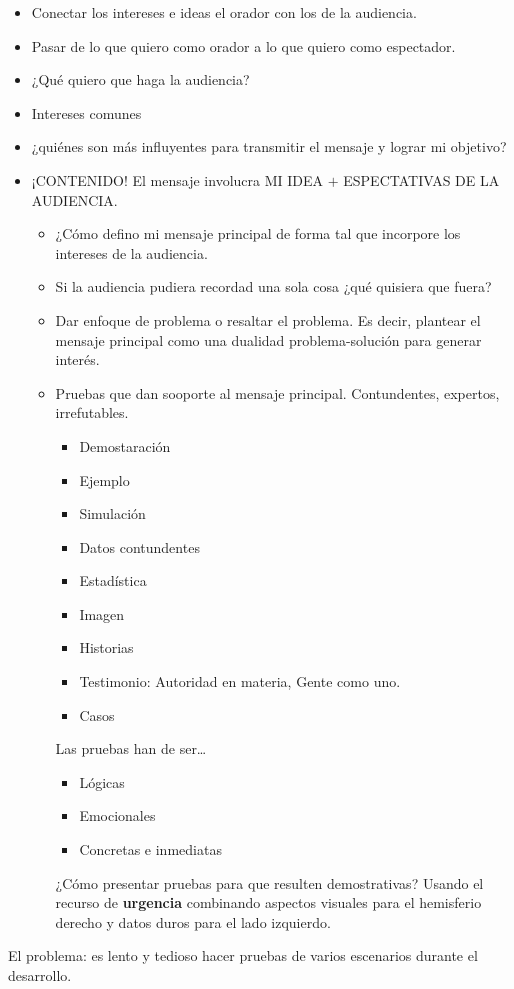 \documentclass[12pt]{article} %
\begin{document}
\begin{itemize}
\item Conectar los intereses e ideas el orador con los de la audiencia. 
\item Pasar de lo que quiero como orador a lo que quiero como espectador.
\item ¿Qué quiero que haga la audiencia?
\item Intereses comunes
\item ¿quiénes son más influyentes para transmitir el mensaje y lograr mi objetivo?
\item ¡CONTENIDO! El mensaje involucra MI IDEA $+$ ESPECTATIVAS DE LA AUDIENCIA.
\begin{itemize}
\item ¿Cómo defino mi mensaje principal de forma tal que incorpore los intereses de la audiencia.
\item Si la audiencia pudiera recordad una sola cosa ¿qué quisiera que fuera?
\item Dar enfoque de problema o resaltar el problema. Es decir, plantear el mensaje principal como una dualidad problema-solución para generar interés.
\item Pruebas que dan sooporte al mensaje principal. Contundentes, expertos, irrefutables.
\begin{itemize}
\item Demostaración
\item Ejemplo
\item Simulación
\item Datos contundentes
\item Estadística
\item Imagen
\item Historias
\item Testimonio: Autoridad en materia, Gente como uno.
\item Casos
\end{itemize}
Las pruebas han de ser\ldots
\begin{itemize}
\item Lógicas
\item Emocionales
\item Concretas e inmediatas
\end{itemize}
¿Cómo presentar pruebas para que resulten demostrativas? Usando el recurso de \textbf{urgencia} combinando aspectos visuales para el hemisferio derecho y datos duros para el lado izquierdo.
\end{itemize}
\end{itemize}
El problema: es lento y tedioso hacer pruebas de varios escenarios durante el desarrollo.
\end{document}
